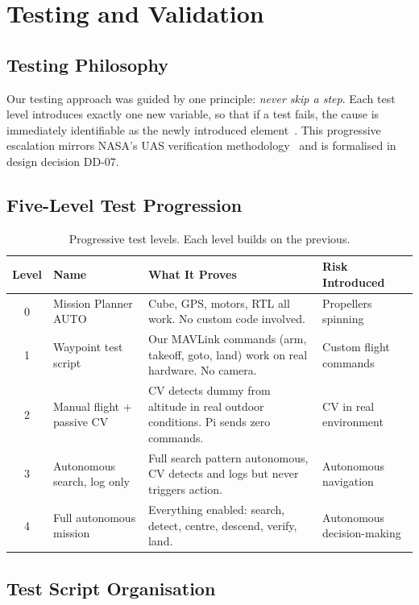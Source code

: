 \section{Testing and Validation}
\label{sec:testing}

\subsection{Testing Philosophy}

Our testing approach was guided by one principle: \textit{never skip a step}. Each test level introduces exactly one new variable, so that if a test fails, the cause is immediately identifiable as the newly introduced element~\cite{koopman2016challenges, myers2011art}. This progressive escalation mirrors NASA's UAS verification methodology~\cite{nasa2015vv} and is formalised in design decision DD-07.

\subsection{Five-Level Test Progression}

\begin{table}[htbp]
\centering
\compactTable
\caption{Progressive test levels. Each level builds on the previous.}
\label{tab:test_levels}
\begin{tabularx}{\linewidth}{c l X l}
\toprule
\textbf{Level} & \textbf{Name} & \textbf{What It Proves} & \textbf{Risk Introduced} \\
\midrule
0 & Mission Planner AUTO & Cube, GPS, motors, RTL all work. No custom code involved. & Propellers spinning \\
1 & Waypoint test script & Our MAVLink commands (arm, takeoff, goto, land) work on real hardware. No camera. & Custom flight commands \\
2 & Manual flight + passive CV & CV detects dummy from altitude in real outdoor conditions. Pi sends zero commands. & CV in real environment \\
3 & Autonomous search, log only & Full search pattern autonomous, CV detects and logs but never triggers action. & Autonomous navigation \\
4 & Full autonomous mission & Everything enabled: search, detect, centre, descend, verify, land. & Autonomous decision-making \\
\bottomrule
\end{tabularx}
\end{table}

\subsection{Test Script Organisation}

